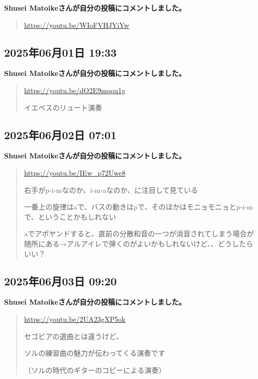 \textbf{Shusei Matoikeさんが自分の投稿にコメントしました。}

\begin{quote}
\url{https://youtu.be/WIoFVHJYiYw}
\end{quote}

\subsection*{2025年06月01日 19:33}

\textbf{Shusei Matoikeさんが自分の投稿にコメントしました。}

\begin{quote}
\url{https://youtu.be/dO2E9mqou1g}

イエペスのリュート演奏
\end{quote}

\subsection*{2025年06月02日 07:01}

\textbf{Shusei Matoikeさんが自分の投稿にコメントしました。}

\begin{quote}
\url{https://youtu.be/IEw_p72Uwe8}

右手がp-i-mなのか、i-m-aなのか、に注目して見ている

一番上の旋律はaで、バスの動きはpで、そのほかはモニョモニョとp-i-mで、ということかもしれない

aでアポヤンドすると、直前の分散和音の一つが消音されてしまう場合が随所にある→アルアイレで弾くのがよいかもしれないけど、、どうしたらいい？
\end{quote}

\subsection*{2025年06月03日 09:20}

\textbf{Shusei Matoikeさんが自分の投稿にコメントしました。}

\begin{quote}
\url{https://youtu.be/2UA23gXP5ok}

セゴビアの選曲とは違うけど、

ソルの練習曲の魅力が伝わってくる演奏です

（ソルの時代のギターのコピーによる演奏）
\end{quote}


